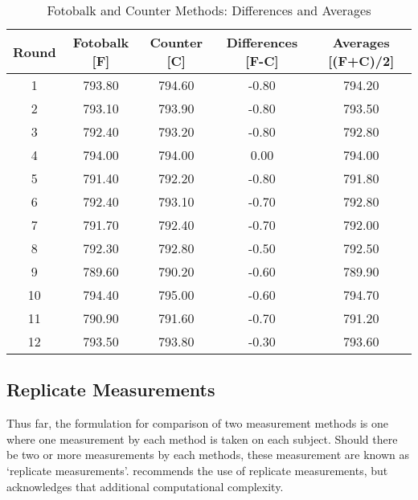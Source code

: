 \documentclass[MAIN.tex]{subfiles}
\begin{document}
	
	
	
	
	\newpage
	\begin{table}[tbh]
		\begin{center}
			
			\begin{tabular}{|c|c|c|c|c|}
				\hline
				Round & Fotobalk [F] & Counter [C] & Differences [F-C] & Averages [(F+C)/2] \\
				\hline
				1 & 793.80 & 794.60 & -0.80 & 794.20 \\
				2 & 793.10 & 793.90 & -0.80 & 793.50 \\
				3 & 792.40 & 793.20 & -0.80 & 792.80 \\
				4 & 794.00 & 794.00 & 0.00 & 794.00 \\
				5 & 791.40 & 792.20 & -0.80 & 791.80 \\
				6 & 792.40 & 793.10 & -0.70 & 792.80 \\
				7 & 791.70 & 792.40 & -0.70 & 792.00 \\
				8 & 792.30 & 792.80 & -0.50 & 792.50 \\
				9 & 789.60 & 790.20 & -0.60 & 789.90 \\
				10 & 794.40 & 795.00 & -0.60 & 794.70 \\
				11 & 790.90 & 791.60 & -0.70 & 791.20 \\
				12 & 793.50 & 793.80 & -0.30 & 793.60 \\
				\hline
			\end{tabular}
			\caption{Fotobalk and Counter Methods: Differences and Averages}
		\end{center}
	\end{table}
	
	
	
	
	
	
	\subsection{Replicate Measurements}
	
	Thus far, the formulation for comparison of two measurement
	methods is one where one measurement by each method is taken on
	each subject. Should there be two or more measurements by each
	methods, these measurement are known as `replicate measurements'.
	\citet{BXC2008} recommends the use of replicate measurements, but
	acknowledges that  additional computational complexity.
	
\end{document}
